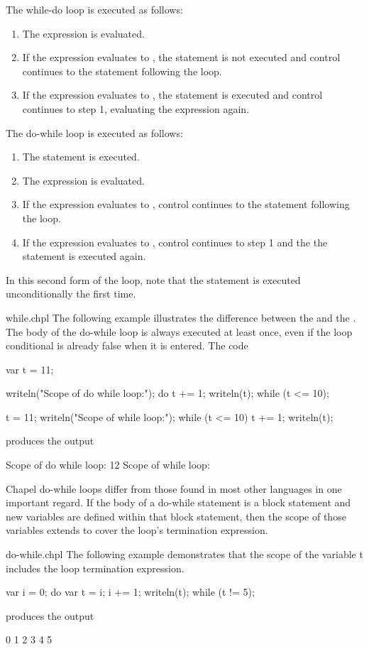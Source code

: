 \pagebreak
The while-do loop is executed as follows:
\begin{enumerate}
\item The expression is evaluated.
\item If the expression evaluates to , the statement is
  not executed and control continues to the statement following the
  loop.
\item If the expression evaluates to , the statement is
  executed and control continues to step 1, evaluating the expression
  again.
\end{enumerate}

The do-while loop is executed as follows:
\begin{enumerate}
\item The statement is executed.
\item The expression is evaluated.
\item If the expression evaluates to , control continues
  to the statement following the loop.
\item If the expression evaluates to , control continues to
  step 1 and the the statement is executed again.
\end{enumerate}
In this second form of the loop, note that the statement is executed
unconditionally the first time.

\begin{chapelexample}{while.chpl}
The following example illustrates the difference between
the  and the .  The body of
the do-while loop is always executed at least once, even if the loop conditional
is already false when it is entered.  The code
\begin{chapel}
var t = 11;

writeln("Scope of do while loop:");
do {
  t += 1;
  writeln(t);
} while (t <= 10);

t = 11;
writeln("Scope of while loop:");
while (t <= 10) {
  t += 1;
  writeln(t);
}
\end{chapel}
produces the output
\begin{chapelprintoutput}{}
Scope of do while loop:
12
Scope of while loop:
\end{chapelprintoutput}
\end{chapelexample}

\pagebreak
Chapel do-while loops differ from those found in most other languages in
one important regard.  If the body of a do-while statement is a block
statement and new variables are defined within that block statement,
then the scope of those variables extends to cover the loop's
termination expression.
\begin{chapelexample}{do-while.chpl}
The following example demonstrates that the scope of the variable t
includes the loop termination expression.
\begin{chapel}
var i = 0;
do {
  var t = i;
  i += 1;
  writeln(t);
} while (t != 5);
\end{chapel}
produces the output
\begin{chapelprintoutput}{}
0
1
2
3
4
5
\end{chapelprintoutput}
\end{chapelexample}


